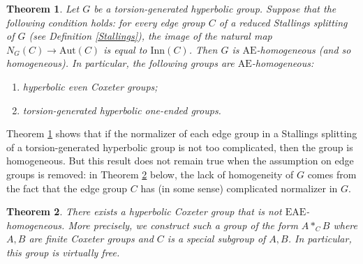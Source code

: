 \documentclass[a4paper, 11pt]{amsart}
\newtheorem{te}{Theorem}[section]
\theoremstyle{definition}
\theoremstyle{remark}
\renewcommand{\geq}{\geqslant}
\begin{document}

\begin{te}\label{AE}
Let $G$ be a torsion-generated hyperbolic group. Suppose that the following condition holds: for every edge group $C$ of a reduced Stallings splitting of $G$ (see Definition \ref{Stallings}), the image of the natural map $N_G(C)\rightarrow \mathrm{Aut}(C)$ is equal to $\mathrm{Inn}(C)$. Then $G$ is $\mathrm{AE}$-homogeneous (and so homogeneous). In particular, the following groups are $\mathrm{AE}$-homogeneous:
\begin{enumerate}[(1)]
    \item[$\bullet$] hyperbolic even Coxeter groups;
    \item[$\bullet$] torsion-generated hyperbolic one-ended groups.
\end{enumerate}
\end{te}



Theorem \ref{AE} shows that if the normalizer of each edge group in a Stallings splitting of a torsion-generated hyperbolic group is not too complicated, then the group is homogeneous. But this result does not remain true when the assumption on edge groups is removed: in Theorem \ref{EAE_intro} below, the lack of homogeneity of $G$ comes from the fact that the edge group $C$ has (in some sense) complicated normalizer in $G$. 

\begin{te}\label{EAE_intro}There exists a hyperbolic Coxeter group that is not $\mathrm{EAE}$-homogeneous. More precisely, we construct such a group of the form $A\ast_C B$ where $A,B$ are finite Coxeter groups and $C$ is a special subgroup of $A,B$. In particular, this group is virtually free.
\end{te}
\end{document}
